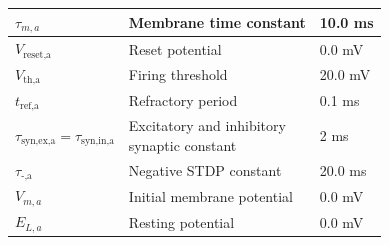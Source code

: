 \documentclass[a4paper,12pt,openright]{book}
\let\oldtable\table
\let\endoldtable\endtable
\renewenvironment{table}[1][htbp] %
{
    \oldtable[#1]
    \footnotesize                     %
}
{
    \endoldtable
}
\begin{document}
\begin{table}[htbp]
\begin{tabular}{lll}
\(\tau_{m,a}\) & Membrane time constant & 10.0 ms \\ \hline
\(V_{\text{reset,a}}\) & Reset potential & 0.0 mV \\ \hline
\(V_{\text{th,a}}\) & Firing threshold & 20.0 mV \\ \hline
\(t_{\text{ref,a}}\) & Refractory period & 0.1 ms \\ \hline
\(\tau_{\text{syn,ex,a}}=\tau_{\text{syn,in,a}}\) & \makecell[l]{Excitatory and inhibitory \\ synaptic constant} & 2 ms \\ \hline
\(\tau_{\text{-,a}}\) & Negative STDP constant & 20.0 ms \\ \hline
\(V_{m,a}\) & Initial membrane potential & 0.0 mV \\ \hline
\(E_{L,a}\) & Resting potential & 0.0 mV \\ \hline
\end{tabular}
\caption{Neuron parameters}
\label{tab:params2}
\end{table}
\end{document}
